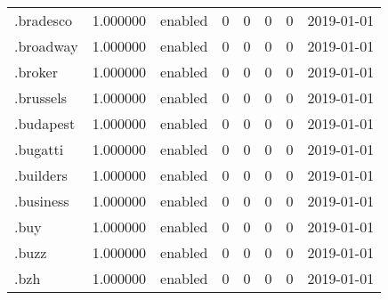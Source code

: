 \begin{tabular}{lrlrrrrl}
.bradesco                 &          1.000000 &         enabled &                           0 &                           0 &                           0 &                   0 &           2019-01-01 \\
.broadway                 &          1.000000 &         enabled &                           0 &                           0 &                           0 &                   0 &           2019-01-01 \\
.broker                   &          1.000000 &         enabled &                           0 &                           0 &                           0 &                   0 &           2019-01-01 \\
.brussels                 &          1.000000 &         enabled &                           0 &                           0 &                           0 &                   0 &           2019-01-01 \\
.budapest                 &          1.000000 &         enabled &                           0 &                           0 &                           0 &                   0 &           2019-01-01 \\
.bugatti                  &          1.000000 &         enabled &                           0 &                           0 &                           0 &                   0 &           2019-01-01 \\
.builders                 &          1.000000 &         enabled &                           0 &                           0 &                           0 &                   0 &           2019-01-01 \\
.business                 &          1.000000 &         enabled &                           0 &                           0 &                           0 &                   0 &           2019-01-01 \\
.buy                      &          1.000000 &         enabled &                           0 &                           0 &                           0 &                   0 &           2019-01-01 \\
.buzz                     &          1.000000 &         enabled &                           0 &                           0 &                           0 &                   0 &           2019-01-01 \\
.bzh                      &          1.000000 &         enabled &                           0 &                           0 &                           0 &                   0 &           2019-01-01 \\

\end{tabular}
